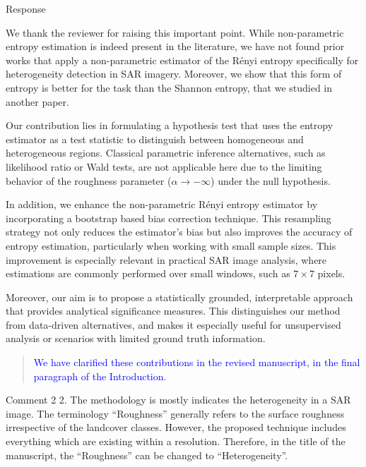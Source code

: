 \documentclass[11pt]{report}
\begin{document}
\begin{responsebox}{Response}


We thank the reviewer for raising this important point. While non-parametric entropy estimation is indeed present in the literature, we have not found prior works that apply a non-parametric estimator of the Rényi entropy specifically for heterogeneity detection in SAR imagery.
Moreover, we show that this form of entropy is better for the task than the Shannon entropy, that we studied in another paper.

Our contribution lies in formulating a hypothesis test that uses the entropy estimator as a test statistic to distinguish between homogeneous and heterogeneous regions. Classical parametric inference alternatives, such as likelihood ratio or Wald tests, are not applicable here due to the limiting behavior of the roughness parameter (\(\alpha \to -\infty\)) under the null hypothesis.

In addition, we enhance the non-parametric Rényi entropy estimator by incorporating a bootstrap based bias correction technique. This resampling strategy not only reduces the estimator’s bias but also improves the accuracy of entropy estimation, particularly when working with small sample sizes. This improvement is especially relevant in practical SAR image analysis, where estimations are commonly performed over small windows, such as \(7 \times 7\) pixels.

Moreover, our aim is to propose a statistically grounded, interpretable approach that provides analytical significance measures. This distinguishes our method from data-driven alternatives, and makes it especially useful for unsupervised analysis or scenarios with limited ground truth information.



\begin{quote}
	\textcolor{blue}{ We have clarified these contributions in the revised manuscript, in the final paragraph of the Introduction.}
\end{quote}

\end{responsebox}

\vspace{1em}
\begin{reviewbox}{Comment 2}
2. The methodology is mostly indicates the heterogeneity in a SAR image. The terminology ``Roughness'' generally refers to the surface roughness irrespective of the landcover classes. However, the proposed technique includes everything which are existing within a resolution. Therefore, in the title of the manuscript, the ``Roughness'' can be changed to ``Heterogeneity''.
\end{reviewbox}
\end{document}
